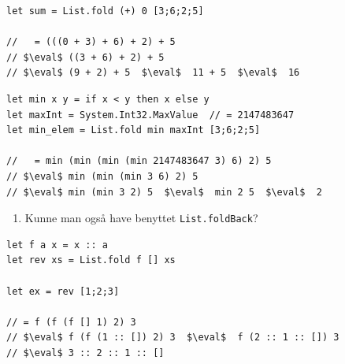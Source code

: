 \documentclass[rgb]{beamer}
\begin{document}
\begin{frame}[fragile]
\begin{footnotesize}

\vspace{1ex}

\begin{lstlisting}[numbers=none,frame=none,mathescape]
let sum = List.fold (+) 0 [3;6;2;5]

//   = (((0 + 3) + 6) + 2) + 5
// $\eval$ ((3 + 6) + 2) + 5
// $\eval$ (9 + 2) + 5  $\eval$  11 + 5  $\eval$  16
\end{lstlisting}

\vspace{1ex}
\vspace{1ex}

\begin{lstlisting}[numbers=none,frame=none,mathescape]
let min x y = if x < y then x else y
let maxInt = System.Int32.MaxValue  // = 2147483647
let min_elem = List.fold min maxInt [3;6;2;5]

//   = min (min (min (min 2147483647 3) 6) 2) 5
// $\eval$ min (min (min 3 6) 2) 5
// $\eval$ min (min 3 2) 5  $\eval$  min 2 5  $\eval$  2
\end{lstlisting}

\vspace{1ex}
\begin{enumerate}
\item Kunne man også have benyttet \lstinline{List.foldBack}?
\end{enumerate}

\end{footnotesize}
\end{frame}

\begin{frame}[fragile]
\begin{footnotesize}
\vspace{1ex}

\begin{lstlisting}[numbers=none,frame=none,mathescape]
let f a x = x :: a
let rev xs = List.fold f [] xs

let ex = rev [1;2;3]

// = f (f (f [] 1) 2) 3
// $\eval$ f (f (1 :: []) 2) 3  $\eval$  f (2 :: 1 :: []) 3
// $\eval$ 3 :: 2 :: 1 :: []
\end{lstlisting}

\end{footnotesize}
\end{frame}
\end{document}
